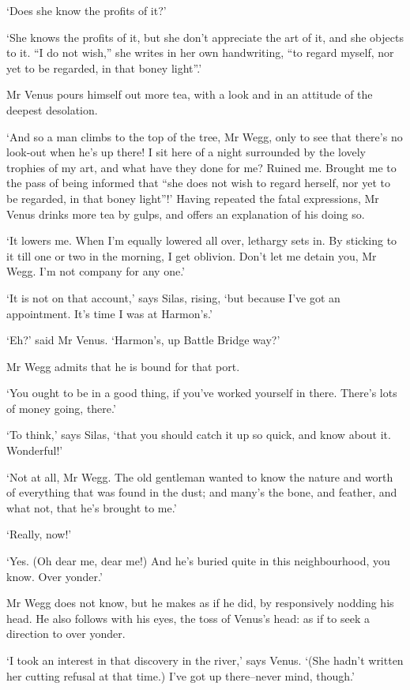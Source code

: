 ‘Does she know the profits of it?’

‘She knows the profits of it, but she don’t appreciate the art of
it, and she objects to it. “I do not wish,” she writes in her own
handwriting, “to regard myself, nor yet to be regarded, in that boney
light”.’

Mr Venus pours himself out more tea, with a look and in an attitude of
the deepest desolation.

‘And so a man climbs to the top of the tree, Mr Wegg, only to see that
there’s no look-out when he’s up there! I sit here of a night surrounded
by the lovely trophies of my art, and what have they done for me? Ruined
me. Brought me to the pass of being informed that “she does not wish to
regard herself, nor yet to be regarded, in that boney light”!’ Having
repeated the fatal expressions, Mr Venus drinks more tea by gulps, and
offers an explanation of his doing so.

‘It lowers me. When I’m equally lowered all over, lethargy sets in. By
sticking to it till one or two in the morning, I get oblivion. Don’t let
me detain you, Mr Wegg. I’m not company for any one.’

‘It is not on that account,’ says Silas, rising, ‘but because I’ve got
an appointment. It’s time I was at Harmon’s.’

‘Eh?’ said Mr Venus. ‘Harmon’s, up Battle Bridge way?’

Mr Wegg admits that he is bound for that port.

‘You ought to be in a good thing, if you’ve worked yourself in there.
There’s lots of money going, there.’

‘To think,’ says Silas, ‘that you should catch it up so quick, and know
about it. Wonderful!’

‘Not at all, Mr Wegg. The old gentleman wanted to know the nature and
worth of everything that was found in the dust; and many’s the bone, and
feather, and what not, that he’s brought to me.’

‘Really, now!’

‘Yes. (Oh dear me, dear me!) And he’s buried quite in this
neighbourhood, you know. Over yonder.’

Mr Wegg does not know, but he makes as if he did, by responsively
nodding his head. He also follows with his eyes, the toss of Venus’s
head: as if to seek a direction to over yonder.

‘I took an interest in that discovery in the river,’ says Venus.
‘(She hadn’t written her cutting refusal at that time.) I’ve got up
there--never mind, though.’

